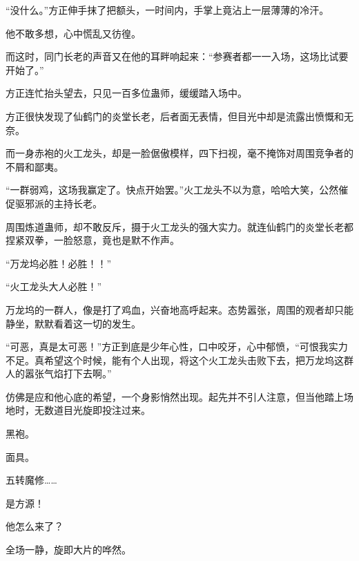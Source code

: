 \begin{this_body}
“没什么。”方正伸手抹了把额头，一时间内，手掌上竟沾上一层薄薄的冷汗。

他不敢多想，心中慌乱又彷徨。

而这时，同门长老的声音又在他的耳畔响起来：“参赛者都一一入场，这场比试要开始了。”

方正连忙抬头望去，只见一百多位蛊师，缓缓踏入场中。

方正很快发现了仙鹤门的炎堂长老，后者面无表情，但目光中却是流露出愤慨和无奈。

而一身赤袍的火工龙头，却是一脸倨傲模样，四下扫视，毫不掩饰对周围竞争者的不屑和鄙夷。

“一群弱鸡，这场我赢定了。快点开始罢。”火工龙头不以为意，哈哈大笑，公然催促驱邪派的主持长老。

周围炼道蛊师，却不敢反斥，摄于火工龙头的强大实力。就连仙鹤门的炎堂长老都捏紧双拳，一脸怒意，竟也是默不作声。

“万龙坞必胜！必胜！！”

“火工龙头大人必胜！”

万龙坞的一群人，像是打了鸡血，兴奋地高呼起来。态势嚣张，周围的观者却只能静坐，默默看着这一切的发生。

“可恶，真是太可恶！”方正到底是少年心性，口中咬牙，心中郁愤，“可恨我实力不足。真希望这个时候，能有个人出现，将这个火工龙头击败下去，把万龙坞这群人的嚣张气焰打下去啊。”

仿佛是应和他心底的希望，一个身影悄然出现。起先并不引人注意，但当他踏上场地时，无数道目光旋即投注过来。

黑袍。

面具。

五转魔修……

是方源！

他怎么来了？

全场一静，旋即大片的哗然。

\end{this_body}

